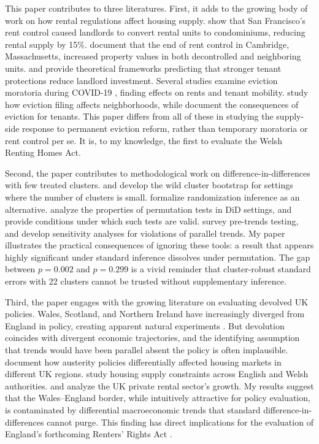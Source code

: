 \documentclass[12pt]{article}
\begin{document}
This paper contributes to three literatures. First, it adds to the growing body of work on how rental regulations affect housing supply. \citet{diamond2019effects} show that San Francisco's rent control caused landlords to convert rental units to condominiums, reducing rental supply by 15\%. \citet{autor2014housing} document that the end of rent control in Cambridge, Massachusetts, increased property values in both decontrolled and neighboring units. \citet{arnott1995time} and \citet{arnott2003tenancy} provide theoretical frameworks predicting that stronger tenant protections reduce landlord investment. Several studies examine eviction moratoria during COVID-19 \citep{an2022eviction, humphries2023eviction, jowers2021housing}, finding effects on rents and tenant mobility. \citet{ambrose2015eviction} study how eviction filing affects neighborhoods, while \citet{collinson2024eviction} document the consequences of eviction for tenants. This paper differs from all of these in studying the supply-side response to permanent eviction reform, rather than temporary moratoria or rent control per se. It is, to my knowledge, the first to evaluate the Welsh Renting Homes Act.

Second, the paper contributes to methodological work on difference-in-differences with few treated clusters. \citet{mackinnon2022cluster} and \citet{cameron2008bootstrap} develop the wild cluster bootstrap for settings where the number of clusters is small. \citet{conley2011inference} formalize randomization inference as an alternative. \citet{ferman2019inference} analyze the properties of permutation tests in DiD settings, and \citet{canay2017randomization} provide conditions under which such tests are valid. \citet{roth2023whats} survey pre-trends testing, and \citet{rambachan2023more} develop sensitivity analyses for violations of parallel trends. My paper illustrates the practical consequences of ignoring these tools: a result that appears highly significant under standard inference dissolves under permutation. The gap between $p = 0.002$ and $p = 0.299$ is a vivid reminder that cluster-robust standard errors with 22 clusters cannot be trusted without supplementary inference.

Third, the paper engages with the growing literature on evaluating devolved UK policies. Wales, Scotland, and Northern Ireland have increasingly diverged from England in policy, creating apparent natural experiments \citep{druckman2012natural}. But devolution coincides with divergent economic trajectories, and the identifying assumption that trends would have been parallel absent the policy is often implausible. \citet{beatty2019housing} document how austerity policies differentially affected housing markets in different UK regions. \citet{gibbons2014cost} study housing supply constraints across English and Welsh authorities. \citet{whitehead2016supply} and \citet{scanlon2015private} analyze the UK private rental sector's growth. My results suggest that the Wales--England border, while intuitively attractive for policy evaluation, is contaminated by differential macroeconomic trends that standard difference-in-differences cannot purge. This finding has direct implications for the evaluation of England's forthcoming Renters' Rights Act \citep{wilson2023renters}.
\end{document}

